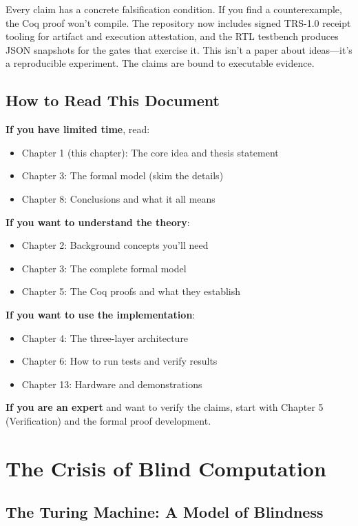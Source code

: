 Every claim has a concrete falsification condition. If you find a counterexample, the Coq proof won't compile. The repository now includes signed TRS-1.0 receipt tooling for artifact and execution attestation, and the RTL testbench produces JSON snapshots for the gates that exercise it. This isn't a paper about ideas---it's a reproducible experiment. The claims are bound to executable evidence.

\subsection{How to Read This Document}

\textbf{If you have limited time}, read:
\begin{itemize}
    \item Chapter 1 (this chapter): The core idea and thesis statement
    \item Chapter 3: The formal model (skim the details)
    \item Chapter 8: Conclusions and what it all means
\end{itemize}

\textbf{If you want to understand the theory}:
\begin{itemize}
    \item Chapter 2: Background concepts you'll need
    \item Chapter 3: The complete formal model
    \item Chapter 5: The Coq proofs and what they establish
\end{itemize}

\textbf{If you want to use the implementation}:
\begin{itemize}
    \item Chapter 4: The three-layer architecture
    \item Chapter 6: How to run tests and verify results
    \item Chapter 13: Hardware and demonstrations
\end{itemize}

\textbf{If you are an expert} and want to verify the claims, start with Chapter 5 (Verification) and the formal proof development.

\section{The Crisis of Blind Computation}

\subsection{The Turing Machine: A Model of Blindness}

